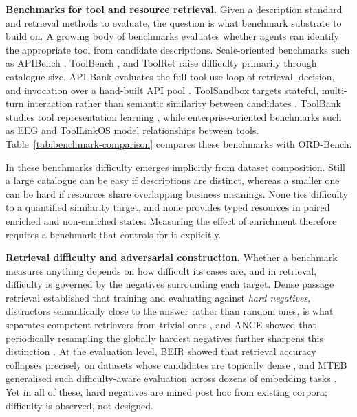 \documentclass[10pt,twocolumn]{article}
\begin{document}
\textbf{Benchmarks for tool and resource retrieval.}
Given a description standard and retrieval methods to evaluate, the question is what benchmark substrate to build on. A growing body of benchmarks evaluates whether agents can identify the appropriate tool from candidate descriptions. Scale-oriented benchmarks such as APIBench \citep{gonzalez_gorilla_2024}, ToolBench \citep{qin_toolllm_nodate}, and ToolRet \citep{shi_retrieval_2025} raise difficulty primarily through catalogue size. API-Bank evaluates the full tool-use loop of retrieval, decision, and invocation over a hand-built API pool \citep{li_apibank_2023}. ToolSandbox targets stateful, multi-turn interaction rather than semantic similarity between candidates \citep{lu_toolsandbox_2025}. ToolBank studies tool representation learning \citep{moon_toolbank_2024}, while enterprise-oriented benchmarks such as EEG \citep{bansal_planning_2025} and ToolLinkOS \citep{lumer_toollinked_2025} model relationships between tools. Table~\ref{tab:benchmark-comparison} compares these benchmarks with ORD-Bench.

In these benchmarks difficulty emerges implicitly from dataset composition. Still a large catalogue can be easy if descriptions are distinct, whereas a smaller one can be hard if resources share overlapping business meanings. None ties difficulty to a quantified similarity target, and none provides typed resources in paired enriched and non-enriched states. Measuring the effect of enrichment therefore requires a benchmark that controls for it explicitly.

\textbf{Retrieval difficulty and adversarial construction.}
Whether a benchmark measures anything depends on how difficult its cases are, and in retrieval, difficulty is governed by the negatives surrounding each target. Dense passage retrieval established that training and evaluating against \emph{hard negatives}, distractors semantically close to the answer rather than random ones, is what separates competent retrievers from trivial ones \citep{karpukhin_dense_2020}, and ANCE showed that periodically resampling the globally hardest negatives further sharpens this distinction \citep{xiong_ance_2021}. At the evaluation level, BEIR showed that retrieval accuracy collapses precisely on datasets whose candidates are topically dense \citep{thakur_beir_2021}, and MTEB generalised such difficulty-aware evaluation across dozens of embedding tasks \citep{muennighoff_mteb_2023}. Yet in all of these, hard negatives are mined post hoc from existing corpora; difficulty is observed, not designed. 
\end{document}
